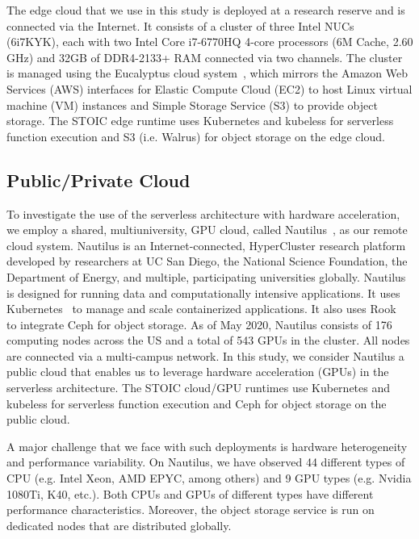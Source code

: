 The edge cloud that we use in this study is deployed at a research reserve
and is connected via the Internet.  It consists of a
cluster of three Intel NUCs~\cite{ref:nucs} (6i7KYK), each with two Intel Core
i7-6770HQ 4-core processors (6M Cache, 2.60 GHz) and 32GB of DDR4-2133+ RAM
connected via two channels. The cluster is managed using the Eucalyptus cloud
system~\cite{ref:euca}, which mirrors the Amazon Web Services (AWS) interfaces
for Elastic Compute Cloud (EC2) to host Linux virtual machine (VM) instances and
Simple Storage Service (S3) to provide object storage. 
The STOIC edge runtime uses Kubernetes and kubeless for serverless function 
execution and S3 (i.e. Walrus) for object storage on the edge cloud.
 
\subsection{Public/Private Cloud}

To investigate the use of the serverless architecture with hardware
acceleration, we employ a shared, multiuniversity, GPU cloud, called
Nautilus~\cite{ref:nautilus}, as our remote cloud system. Nautilus is an
Internet-connected, HyperCluster research platform developed by researchers at
UC San Diego, the National Science Foundation, the Department of Energy, and
multiple, participating universities globally.  Nautilus is designed for
running data and computationally intensive applications.  It uses
Kubernetes~\cite{ref:k8s} to manage and scale containerized applications. It
also uses Rook~\cite{ref:rook} to integrate Ceph for object storage. As of May
2020, Nautilus consists of 176 computing nodes across the US and a total of
543 GPUs in the cluster. All nodes are connected via a multi-campus network.
In this study, we consider Nautilus a public cloud that enables us to
leverage hardware acceleration (GPUs) in the serverless architecture.
The STOIC cloud/GPU runtimes use Kubernetes and kubeless for serverless function 
execution and Ceph for object storage on the public cloud.

A major challenge that we face with such deployments is hardware heterogeneity
and performance variability. On Nautilus, we have observed 44 different types
of CPU (e.g. Intel Xeon, AMD EPYC, among others) and 9 GPU types (e.g. Nvidia
1080Ti, K40, etc.). Both CPUs and GPUs of different types have different
performance characteristics. Moreover, the object storage service 
is run on dedicated nodes that are distributed globally.

